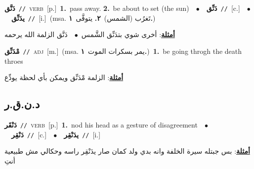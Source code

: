 \documentclass[10pt,a4paper,twoside]{article} %
\begin{document}
\begin{multicols}{2}
{\setlength\topsep{0pt}\textbf{\foreignlanguage{arabic}{دَنَّق}}\ {\color{gray}\texttt{//}\color{black}}\ \textsc{verb}\ [p.]\ \textbf{1.}~pass away.  \textbf{2.}~be about to set (the sun)\ \ $\bullet$\ \ \setlength\topsep{0pt}\textbf{\foreignlanguage{arabic}{دَنِّق}}\ {\color{gray}\texttt{//}\color{black}}\ [c.]\ \ $\bullet$\ \ \setlength\topsep{0pt}\textbf{\foreignlanguage{arabic}{يدَنِّق}}\ {\color{gray}\texttt{//}\color{black}}\ [i.]\ \color{gray}(msa. \foreignlanguage{arabic}{تَغرُب (الشمس)}~\foreignlanguage{arabic}{\textbf{٢.}}  \foreignlanguage{arabic}{يتوفَّى}~\foreignlanguage{arabic}{\textbf{١.}})\color{black}\  \begin{flushright}\color{gray}\foreignlanguage{arabic}{\textbf{\underline{\foreignlanguage{arabic}{أمثلة}}}: أخرى شوي بتدَنِّق الشَّمس\ $\bullet$\ \  دَنَّق الزلمة الله يرحمه}\end{flushright}\color{black}} \vspace{2mm}

{\setlength\topsep{0pt}\textbf{\foreignlanguage{arabic}{مْدَنِّق}}\ {\color{gray}\texttt{//}\color{black}}\ \textsc{adj}\ [m.]\ \color{gray}(msa. \foreignlanguage{arabic}{يمر بسكرات الموت}~\foreignlanguage{arabic}{\textbf{١.}})\color{black}\ \textbf{1.}~be going throgh the death throes\  \begin{flushright}\color{gray}\foreignlanguage{arabic}{\textbf{\underline{\foreignlanguage{arabic}{أمثلة}}}: الزلمة مْدَنِّق ويمكن بأي لحظة يودِّع}\end{flushright}\color{black}} \vspace{2mm}

\vspace{-3mm}
\subsection*{\color{blue}\foreignlanguage{arabic}{د.ن.ق.ر}\color{blue}{}} 

{\setlength\topsep{0pt}\textbf{\foreignlanguage{arabic}{دَنْقَر}}\ {\color{gray}\texttt{//}\color{black}}\ \textsc{verb}\ [p.]\ \textbf{1.}~nod his head as a gesture of disagreement\ \ $\bullet$\ \ \setlength\topsep{0pt}\textbf{\foreignlanguage{arabic}{دَنْقِر}}\ {\color{gray}\texttt{//}\color{black}}\ [c.]\ \ $\bullet$\ \ \setlength\topsep{0pt}\textbf{\foreignlanguage{arabic}{يدَنْقِر}}\ {\color{gray}\texttt{//}\color{black}}\ [i.]\  \begin{flushright}\color{gray}\foreignlanguage{arabic}{\textbf{\underline{\foreignlanguage{arabic}{أمثلة}}}: بس جبتله سيرة الخلفة وانه بدي ولد كمان صار يدَنْقِر راسه وحكالي مش طبيعية أنتِ}\end{flushright}\color{black}} \vspace{2mm}


\end{multicols}
\end{document}
